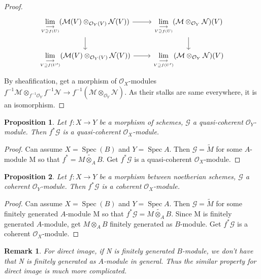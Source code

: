 \documentclass{ctexart}
\newtheorem{remark}{Remark}[section]
\newtheorem{proposition}{Proposition}[section]
\newcommand{\spec}{\operatorname{Spec}}
\begin{document}
\begin{proof}
\begin{equation*}
\begin{tikzcd}
            \underset{\underset{V \supseteq f(U)}{\longrightarrow}}{\lim} (\mathcal{M}(V) \otimes_{\mathcal{O}_{Y}(V)} \mathcal{N}(V)) \arrow[r] \arrow[d] & 
            \underset{\underset{V \supseteq f(U)}{\longrightarrow}}{\lim} (\mathcal{M} \otimes_{\mathcal{O}_{Y}} \mathcal{N})(V) \arrow[d] \\
            \underset{\underset{V \supseteq f(U')}{\longrightarrow}}{\lim} (\mathcal{M}(V) \otimes_{\mathcal{O}_{Y}(V)} \mathcal{N}(V)) \arrow[r] &
            \underset{\underset{V \supseteq f(U')}{\longrightarrow}}{\lim} (\mathcal{M} \otimes_{\mathcal{O}_{Y}} \mathcal{N})(V)
        \end{tikzcd}
    \end{equation*}
    By sheafification, get a morphism of $\mathcal{O}_{X}$-modules $f^{-1}\mathcal{M} \otimes_{f^{-1}\mathcal{O}_{Y}} f^{-1}\mathcal{N} \longrightarrow f^{-1}(\mathcal{M} \otimes_{\mathcal{O}_{Y}} \mathcal{N})$.
    As their stalks are same everywhere, it is an isomorphism.
\end{proof}
\begin{proposition}
    Let $f: X \longrightarrow Y$ be a morphism of schemes, $\mathcal{G}$ a quasi-coherent $\mathcal{O}_{Y}$-module.
    Then $f^{\ast}\mathcal{G}$ is a quasi-coherent $\mathcal{O}_{X}$-module.
    \label{Proposition 6.6}
\end{proposition}
\begin{proof}
    Can assume $X = \spec(B)$ and $Y = \spec A$.
    Then $\mathcal{G} = \widetilde{M}$ for some $A$-module M so that $f^{\ast} = \widetilde{M \otimes_{A} B}$.
    Get $f^{\ast}\mathcal{G}$ is a quasi-coherent $\mathcal{O}_{X}$-module.
\end{proof}
\begin{proposition}
    Let $f: X \longrightarrow Y$ be a morphism between noetherian schemes, $\mathcal{G}$ a coherent $\mathcal{O}_{Y}$-module.
    Then $f^{\ast}\mathcal{G}$ is a coherent $\mathcal{O}_{X}$-module.
    \label{Proposition 6.7}
\end{proposition}
\begin{proof}
    Can assume $X = \spec(B)$ and $Y = \spec A$.
    Then $\mathcal{G} = \widetilde{M}$ for some finitely generated $A$-module M so that $f^{\ast}\mathcal{G} = \widetilde{M \otimes_{A} B}$.
    Since M is finitely generated $A$-module, get $M \otimes_{A} B$ finitely generated as $B$-module.
    Get $f^{\ast}\mathcal{G}$ is a coherent $\mathcal{O}_{X}$-module.
\end{proof}
\begin{remark}
    For direct image, if N is finitely generated $B$-module, we don't have that N is finitely generated as $A$-module in general.
    Thus the similar property for direct image is much more complicated.
\end{remark}
\end{document}
